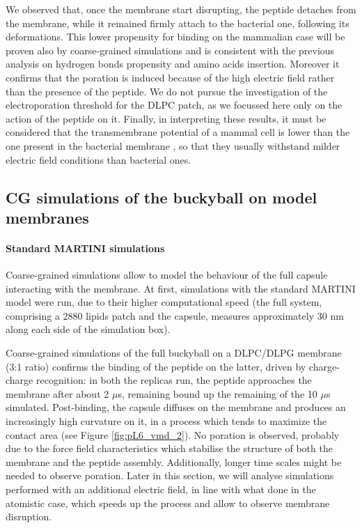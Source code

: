We observed that, once the membrane start disrupting, the peptide detaches from the membrane, while it remained firmly attach to the bacterial one, following its deformations. This lower propensity for binding on the mammalian case will be proven also by coarse-grained simulations and is consistent with the previous analysis on hydrogen bonds propensity and amino acids insertion. Moreover it confirms that the poration is induced because of the high electric field rather than the presence of the peptide. We do not pursue the investigation of the electroporation threshold for the DLPC patch, as we focussed here only on the action of the peptide on it.
%
Finally, in interpreting these results, it must be considered that the transmembrane potential of a mammal cell is lower than the one present in the bacterial membrane \citep{Yeaman2003,Wilson2011}, so that they usually withstand milder electric field conditions than bacterial ones.


\subsection{CG simulations of the buckyball on model membranes} \label{sec:results_lip_cg}

\paragraph{Standard MARTINI simulations} Coarse-grained simulations allow to model the behaviour of the full capsule interacting with the membrane.
%
At first, simulations with the standard MARTINI model were run, due to their higher computational speed (the full system, comprising a 2880 lipids patch and the capsule, measures approximately 30 nm along each side of the simulation box).

Coarse-grained simulations of the full buckyball on a DLPC/DLPG membrane (3:1 ratio) confirms the binding of the peptide on the latter, driven by charge-charge recognition: in both the replicas run, the peptide approaches the membrane after about 2 $\mu$s, remaining bound up the remaining of the 10 $\mu$s simulated.
%
Post-binding, the capsule diffuses on the membrane and produces an increasingly high curvature on it, in a process which tends to maximize the contact area (see Figure \ref{fig:pL6_vmd_2}). No poration is observed, probably due to the force field characteristics which stabilise the structure of both the membrane and the peptide assembly. Additionally, longer time scales might be needed to observe poration. Later in this section, we will analyse simulations performed with an additional electric field, in line with what done in the atomistic case, which speeds up the process and allow to observe membrane disruption.


